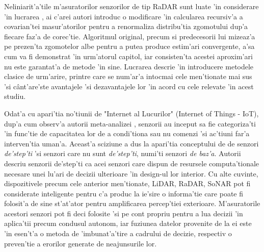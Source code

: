 \documentclass[12pt,a4paper,twoside]{report}
\begin{document}
\vspace{5px}

Neliniarit'a'tile m'asuratorilor senzorilor de tip RaDAR sunt luate 'in considerare 'in lucrarea \cite{s22041302}, ai c'arei autori introduc o modificare 'in calcularea recursiv'a a covarian'tei masur'atorilor pentru a renormaliza distribu'tia zgomotului dup'a fiecare faz'a de corec'tie. Algoritmul original, precum si predecesorii lui mizeaz'a pe prezen'ta zgomotelor albe pentru a putea produce estim'ari convergente, a'sa cum va fi demonstrat 'in urm'atorul capitol, iar consisten'ta acestei aproxim'ari nu este garantat'a de metode 'in sine. Lucrarea descrie 'in introducere metodele clasice de urm'arire, printre care se num'ar'a intocmai cele men'tionate mai sus 'si c\^{a}nt'are'ste avantajele 'si dezavantajele lor 'in acord cu cele relevate 'in acest studiu.

\vspace{5px}

Odat'a cu apari'tia no'tiunii de "Internet al Lucurilor" (Internet of Things - IoT), dup'a cum observ'a autorii meta-analizei \cite{s21062140} , senzorii au inceput sa fie categoriza'ti 'in func'tie de capacitatea lor de a condi'tiona sau nu comenzi 'si ac'tiuni far'a interven'tia uman'a. Aceast'a sciziune a dus la apari'tia conceptului de de senzori \textit{de'step'ti} 'si senzori care nu sunt \textit{de'step'ti}, numi'ti senzori \textit{de baz'a}. Autorii descriu senzorii de'step'ti ca acei senzori care dispun de resursele computa'tionale necesare unei lu'ari de decizii ulterioare 'in design-ul lor interior. Cu alte cuvinte, dispozitivele precum cele anterior men'tionate, LiDAR, RaDAR, SoNAR pot fi considerate inteligente pentru c'a produc la ie'sire o informa'tie care poate fi folosit'a de sine st'at'ator pentru amplificarea percep'tiei exterioare. M'asuratorile acestori senzori pot fi deci folosite 'si pe cont propriu pentru a lua decizii 'in aplica'tii precum condusul autonom, iar fuziunea datelor provenite de la ei este 'in esen't'a o metoda de 'imbunat'a'tire a cadrului de decizie, respectiv o preven'tie a erorilor generate de neajunsurile lor. 

\vspace{5px}
\end{document}
